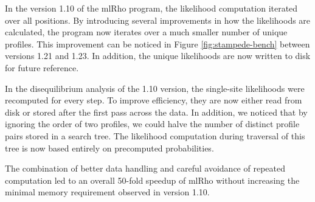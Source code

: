 \documentclass{sig-alternate}
\begin{document}
In the version 1.10 of the mlRho program, the likelihood computation iterated over all positions. By
introducing several improvements in how the likelihoods are calculated, the program now iterates over a much
smaller number of unique profiles. This improvement can be noticed in Figure \ref{fig:stampede-bench} between
versions 1.21 and 1.23.
In addition, the unique likelihoods are now written to disk for future reference.

In the disequilibrium analysis of the 1.10 version, the single-site likelihoods were recomputed for every
step. To improve efficiency, they are now either read from disk or stored after the first pass across the
data. In addition, we noticed that by ignoring the order of two profiles, we could halve the number of
distinct profile pairs stored in a search tree. The likelihood computation during traversal of this tree is
now based entirely on precomputed probabilities.


The combination of better data handling and careful avoidance of repeated computation led to an overall 50-fold
speedup of mlRho without increasing the minimal memory 
requirement observed in version 1.10.
\end{document}
